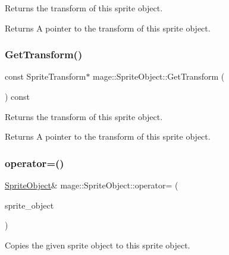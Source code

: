 Returns the transform of this sprite object.

\begin{DoxyReturn}{Returns}
A pointer to the transform of this sprite object. 
\end{DoxyReturn}
\hypertarget{classmage_1_1_sprite_object_a73733c89ee3c47d0e8b8bb81a06bc48c}{}\label{classmage_1_1_sprite_object_a73733c89ee3c47d0e8b8bb81a06bc48c} 
\subsubsection{\texorpdfstring{Get\+Transform()}{GetTransform()}\hspace{0.1cm}{\footnotesize\ttfamily [2/2]}}
{\footnotesize\ttfamily const Sprite\+Transform$\ast$ mage\+::\+Sprite\+Object\+::\+Get\+Transform (\begin{DoxyParamCaption}{ }\end{DoxyParamCaption}) const}

Returns the transform of this sprite object.

\begin{DoxyReturn}{Returns}
A pointer to the transform of this sprite object. 
\end{DoxyReturn}
\hypertarget{classmage_1_1_sprite_object_ab24af642e7c49a13ca5526248f106b4e}{}\label{classmage_1_1_sprite_object_ab24af642e7c49a13ca5526248f106b4e} 
\subsubsection{\texorpdfstring{operator=()}{operator=()}\hspace{0.1cm}{\footnotesize\ttfamily [1/2]}}
{\footnotesize\ttfamily \hyperlink{classmage_1_1_sprite_object}{Sprite\+Object}\& mage\+::\+Sprite\+Object\+::operator= (\begin{DoxyParamCaption}\item[{const \hyperlink{classmage_1_1_sprite_object}{Sprite\+Object} \&}]{sprite\+\_\+object }\end{DoxyParamCaption})\hspace{0.3cm}{\ttfamily [delete]}}

Copies the given sprite object to this sprite object.


